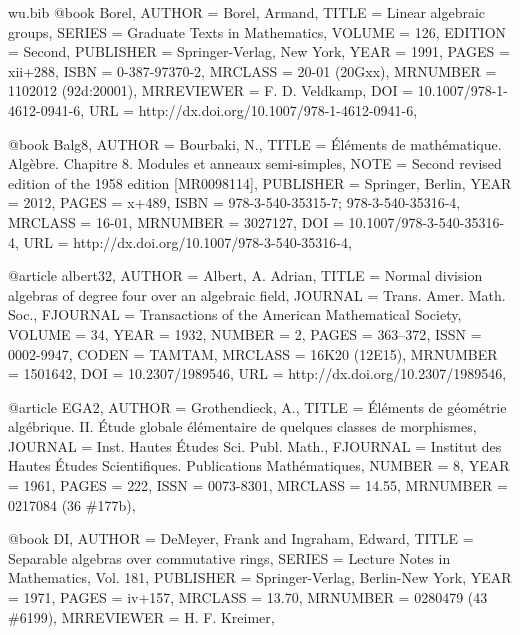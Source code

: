 \documentclass{amsart}
\numberwithin{equation}{section}
\theoremstyle{plain}
\theoremstyle{definition}
\begin{document}
\begin{filecontents}{wu.bib}
@book {Borel, 
    AUTHOR = {Borel, Armand},
     TITLE = {Linear algebraic groups},
    SERIES = {Graduate Texts in Mathematics},
    VOLUME = {126},
   EDITION = {Second},
 PUBLISHER = {Springer-Verlag, New York},
      YEAR = {1991},
     PAGES = {xii+288},
      ISBN = {0-387-97370-2},
   MRCLASS = {20-01 (20Gxx)},
  MRNUMBER = {1102012 (92d:20001)},
MRREVIEWER = {F. D. Veldkamp},
       DOI = {10.1007/978-1-4612-0941-6},
       URL = {http://dx.doi.org/10.1007/978-1-4612-0941-6},
}

@book {Balg8, 
    AUTHOR = {Bourbaki, N.},
     TITLE = {\'{E}l\'ements de math\'ematique. {A}lg\`ebre. {C}hapitre 8.
              {M}odules et anneaux semi-simples},
      NOTE = {Second revised edition of the 1958 edition [MR0098114]},
 PUBLISHER = {Springer, Berlin},
      YEAR = {2012},
     PAGES = {x+489},
      ISBN = {978-3-540-35315-7; 978-3-540-35316-4},
   MRCLASS = {16-01},
  MRNUMBER = {3027127},
       DOI = {10.1007/978-3-540-35316-4},
       URL = {http://dx.doi.org/10.1007/978-3-540-35316-4},
}

@article {albert32, 
    AUTHOR = {Albert, A. Adrian},
     TITLE = {Normal division algebras of degree four over an algebraic
              field},
   JOURNAL = {Trans. Amer. Math. Soc.},
  FJOURNAL = {Transactions of the American Mathematical Society},
    VOLUME = {34},
      YEAR = {1932},
    NUMBER = {2},
     PAGES = {363--372},
      ISSN = {0002-9947},
     CODEN = {TAMTAM},
   MRCLASS = {16K20 (12E15)},
  MRNUMBER = {1501642},
       DOI = {10.2307/1989546},
       URL = {http://dx.doi.org/10.2307/1989546},
}

@article {EGA2, 
    AUTHOR = {Grothendieck, A.},
     TITLE = {\'{E}l\'ements de g\'eom\'etrie alg\'ebrique. {II}. \'{E}tude
              globale \'el\'ementaire de quelques classes de morphismes},
   JOURNAL = {Inst. Hautes \'Etudes Sci. Publ. Math.},
  FJOURNAL = {Institut des Hautes \'Etudes Scientifiques. Publications
              Math\'ematiques},
    NUMBER = {8},
      YEAR = {1961},
     PAGES = {222},
      ISSN = {0073-8301},
   MRCLASS = {14.55},
  MRNUMBER = {0217084 (36 \#177b)},
}

@book {DI, 
    AUTHOR = {DeMeyer, Frank and Ingraham, Edward},
     TITLE = {Separable algebras over commutative rings},
    SERIES = {Lecture Notes in Mathematics, Vol. 181},
 PUBLISHER = {Springer-Verlag, Berlin-New York},
      YEAR = {1971},
     PAGES = {iv+157},
   MRCLASS = {13.70},
  MRNUMBER = {0280479 (43 \#6199)},
MRREVIEWER = {H. F. Kreimer},
}


\end{filecontents}
\end{document}
